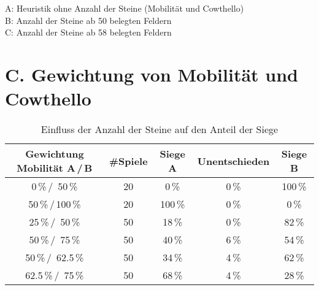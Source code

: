 \small{
A: Heuristik ohne Anzahl der Steine (Mobilität und Cowthello) \\
B: Anzahl der Steine ab 50 belegten Feldern \\
C: Anzahl der Steine ab 58 belegten Feldern}

\pagebreak

\section*{C. Gewichtung von Mobilität und Cowthello}
 
\setcounter{table}{0}
\renewcommand{\thetable}{C\arabic{table}}

\begin{table}[hb]
\centering
\begin{tabular}{c|c|ccc}
\hline
Gewichtung Mobilität A\,/\,B & \#Spiele & Siege A & Unentschieden & Siege B \\
\hline
   0\,\%\,/\, 50\,\% & 20 &  0\,\% &  0\,\% &100\,\% \\
  50\,\%\,/\,100\,\% & 20 &100\,\% &  0\,\% &  0\,\% \\
  25\,\%\,/\, 50\,\% & 50 & 18\,\% &  0\,\% & 82\,\% \\
  50\,\%\,/\, 75\,\% & 50 & 40\,\% &  6\,\% & 54\,\% \\
  50\,\%\,/\, 62.5\,\% & 50 & 34\,\% &  4\,\% & 62\,\% \\
  62.5\,\%\,/\, 75\,\% & 50 & 68\,\% &  4\,\% & 28\,\% \\
\hline
\end{tabular}
\caption{Einfluss der Anzahl der Steine auf den Anteil der Siege}
\label{table:combinedweighting}
\end{table}

\pagebreak

